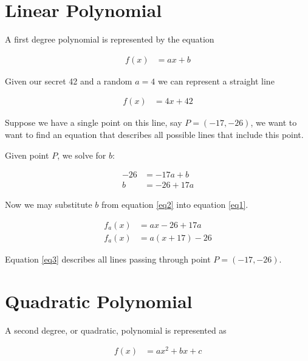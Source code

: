 \documentclass[preview,border=3mm]{article}
\begin{document}
\setcounter{equation}{0}
\renewcommand{\theequation}{\arabic{equation}}

\section{Linear Polynomial}

\noindent
A first degree polynomial is represented by the equation

\begin{align*}
    f(x) &= ax + b
\end{align*}

\noindent
Given our secret 42 and a random $a = 4$ we can represent a straight line

\begin{align}
    f(x) &= 4x + 42 \label{eq1}
\end{align}

\noindent
Suppose we have a single point on this line, say $P = (-17, -26)$, we want to
want to find an equation that describes all possible lines that include this
point.

\noindent
Given point $P$, we solve for $b$:


\begin{align}
    -26 &= -17a + b  \nonumber\\
    b   &= -26 + 17a \label{eq2}
\end{align}

\noindent
Now we may substitute $b$ from equation \ref{eq2} into equation \ref{eq1}.


\begin{align}
    f_a(x) &= ax -26 + 17a \nonumber \\
    f_a(x) &= a(x + 17) - 26 \label{eq3}
\end{align}

\noindent
Equation \ref{eq3} describes all lines passing through point $P = (-17, -26)$.\\


\section{Quadratic Polynomial}

\noindent
A second degree, or quadratic, polynomial is represented as

\begin{align}
    f(x) &= ax^2 + bx + c \label{eq4}
\end{align}
\end{document}
